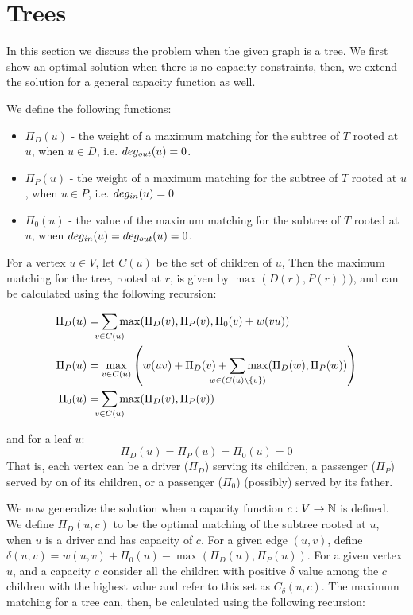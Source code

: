 \section{Trees}
\label{sec:carpool:trees}

\def\Md{\Pi_D}
\def\Mp{\Pi_P}
\def\M0{\Pi_0}

In this section we discuss the problem when the given graph is a tree.
We first show an optimal solution when there is no capacity constraints, 
then, we extend the solution for a general capacity function as well.

We define the following functions:
\begin{itemize}
\item 
$\Md(u)$ - the weight of a maximum matching for the subtree of $T$ rooted at $u$,
when $u \in D$, i.e. $deg_{out}(u) = 0$.

\item
$\Mp(u)$ - the weight of a maximum matching for the subtree of $T$ rooted at
$u$, when $u \in P$, i.e. $deg_{in}(u) = 0$ 

\item
$\M0(u)$ - the value of the maximum matching for the subtree of $T$ rooted at
$u$, when $deg_{in}(u) = deg_{out}(u) = 0$.
\end{itemize}
%
For a vertex $u \in V$, let $C(u)$ be the set of children of $u$,
Then the maximum matching for the tree, rooted at $r$,
is given by $\max{(D(r), P(r)))}$, 
and can be calculated using the following recursion:

\begin{align*}
\Md(u)		& = \smashoperator{\sum_{v \in C(u)}}
				{\max(\Md(v), \Mp(v), \M0(v) + w(vu))}
\\
\Mp(u) 		& = \max_{v \in C(u)}{\left(
				w(uv) +
				\Md(v) +
				\smashoperator{\sum_{w \in (C(u) \setminus \{v\})}}{\max (\Md(w), \Mp(w))}
				\right)}
\\
\M0(u) 		& =  \smashoperator{\sum_{v \in C(u)}}{\max (\Md(v), \Mp(v))}
\end{align*}

and for a leaf $u$:
$$ \Md(u) = \Mp(u) = \M0(u) = 0 $$
%
That is, each vertex can be a driver ($\Md$) serving its children, 
a passenger ($\Mp$) served by on of its children, 
or a passenger ($\M0$) (possibly) served by its father.
  
We now generalize the solution when a capacity function 
$c : V \rightarrow \mathbb{N}$ is defined.
We define $\Md(u, c)$ to be the
optimal matching of the subtree rooted at $u$, when $u$ is a driver and has
capacity of $c$.
For a given edge $(u, v)$, 
define $\delta(u, v) = w(u, v) + \M0(u) - \max (\Md(u), \Mp(u))$.
For a given vertex $u$, and a capacity $c$ 
consider all the children with positive $\delta$ value among the $c$
children with the highest value and refer to this set as $C_\delta(u, c)$. 
The maximum matching for a tree can, then, be calculated using the
following recursion:

